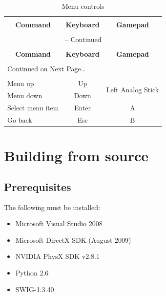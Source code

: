 \documentclass[11pt]{article}
\begin{document}
\begin{center}
\begin{longtable}{lcc}
\caption{Menu controls} \label{menu-controls-table} \\

\hline \hline \\[-2ex]
   \multicolumn{1}{c}{\textbf{Command}} &
   \multicolumn{1}{c}{\textbf{Keyboard}} &
   \multicolumn{1}{c}{\textbf{Gamepad}} \\[0.5ex] \hline
   \\[-1.8ex]
\endfirsthead

\multicolumn{3}{c}{{\tablename} \thetable{} -- Continued} \\[0.5ex]
  \hline \hline \\[-2ex]
  \multicolumn{1}{c}{\textbf{Command}} &
  \multicolumn{1}{c}{\textbf{Keyboard}} &
  \multicolumn{1}{c}{\textbf{Gamepad}} \\[0.5ex] \hline
  \\[-1.8ex]
\endhead

  \multicolumn{3}{l}{{Continued on Next Page\ldots}} \\
\endfoot

  \\[-1.8ex] \hline \hline
\endlastfoot

Menu up & Up & \multirow{2}{*}{Left Analog Stick}\\ 
Menu down & Down \\ 
Select menu item & Enter & A \\ 
Go back & Esc & B \\
\end{longtable}
\end{center}


\section{Building from source}
\label{building-from-source}

\subsection{Prerequisites}

The following must be installed:
  
\begin{itemize}
  \item Microsoft Visual Studio 2008
  \item Microsoft DirectX SDK (August 2009)
  \item NVIDIA PhysX SDK v2.8.1
  \item Python 2.6
  \item SWIG-1.3.40
\end{itemize}  
  
\end{document}
